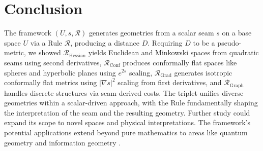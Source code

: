 \documentclass[twoside,twocolumn]{article}
\begin{document}

\setcounter{equation}{0}
\section{Conclusion}
The framework \( (U, s, \mathcal{R}) \) generates geometries from a scalar seam \( s \) on a base space \( U \) via a Rule \( \mathcal{R} \), producing a distance \( D \). Requiring \( D \) to be a pseudo-metric, we showed \( \mathcal{R}_{\text{Hessian}} \) yields Euclidean and Minkowski spaces from quadratic seams using second derivatives, \( \mathcal{R}_{\text{Conf}} \) produces conformally flat spaces like spheres and hyperbolic planes using \( e^{2s} \) scaling, \( \mathcal{R}_{\text{Grad}} \) generates isotropic conformally flat metrics using \( |\nabla s|^2 \) scaling from first derivatives, and \( \mathcal{R}_{\text{Graph}} \) handles discrete structures via seam-derived costs. The triplet unifies diverse geometries within a scalar-driven approach, with the Rule fundamentally shaping the interpretation of the seam and the resulting geometry. Further study could expand its scope to novel spaces and physical interpretations.
The framework's potential applications extend beyond pure mathematics to areas like quantum geometry \cite{AshtekarSchilling1999} and information geometry \cite{FujiiOgura2015}.


\end{document}
